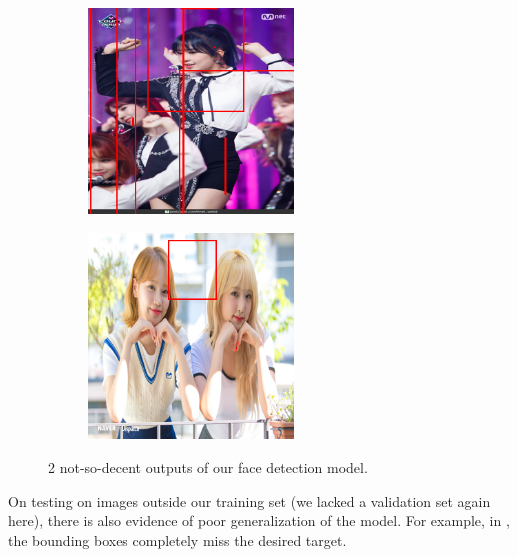 \begin{figure}[htbp]
    \centering
    \begin{subfigure}{0.495\textwidth}
        \centering
        \includegraphics[width=0.6\textwidth]{images/faceDetec/training/result-3.png}
    \end{subfigure}
    \hfill
    \begin{subfigure}{0.495\textwidth}
        \centering
        \includegraphics[width=0.6\textwidth]{images/faceDetec/training/result-4.png}
    \end{subfigure}
    \caption{
        2 not-so-decent outputs of our face detection model.
    }
    \label{Figure:Face-Detection:training:outputs-bad}
\end{figure}

On testing on images outside our training set (we lacked a validation set again here), there is also evidence of poor generalization of the model.
For example, in , the bounding boxes completely miss the desired target.

